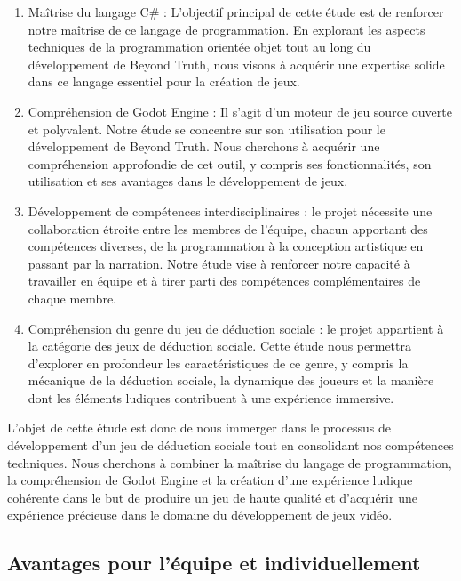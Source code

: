 \documentclass[
	article,			%
	11pt,				%
	oneside,			%
	a4paper,			%
	chapter=TITLE,
	french,			%
	sumario=tradicional
	]{base_nt}
\begin{document}
\begin{enumerate}
    \item Maîtrise du langage C\# : L'objectif principal de cette étude est de renforcer notre maîtrise de ce langage de programmation. En explorant les aspects techniques de la programmation orientée objet tout au long du développement de Beyond Truth, nous visons à acquérir une expertise solide dans ce langage essentiel pour la création de jeux.

    \item Compréhension de Godot Engine : Il s'agit d'un moteur de jeu source ouverte et polyvalent. Notre étude se concentre sur son utilisation pour le développement de Beyond Truth. Nous cherchons à acquérir une compréhension approfondie de cet outil, y compris ses fonctionnalités, son utilisation et ses avantages dans le développement de jeux.

    \item Développement de compétences interdisciplinaires : le projet nécessite une collaboration étroite entre les membres de l'équipe, chacun apportant des compétences diverses, de la programmation à la conception artistique en passant par la narration. Notre étude vise à renforcer notre capacité à travailler en équipe et à tirer parti des compétences complémentaires de chaque membre.

    \item Compréhension du genre du jeu de déduction sociale : le projet appartient à la catégorie des jeux de déduction sociale. Cette étude nous permettra d'explorer en profondeur les caractéristiques de ce genre, y compris la mécanique de la déduction sociale, la dynamique des joueurs et la manière dont les éléments ludiques contribuent à une expérience immersive.
\end{enumerate}

L'objet de cette étude est donc de nous immerger dans le processus de développement d'un jeu de déduction sociale tout en consolidant nos compétences techniques. Nous cherchons à combiner la maîtrise du langage de programmation, la compréhension de Godot Engine et la création d'une expérience ludique cohérente dans le but de produire un jeu de haute qualité et d'acquérir une expérience précieuse dans le domaine du développement de jeux vidéo.

\subsection{Avantages pour l'équipe et individuellement}
\end{document}
